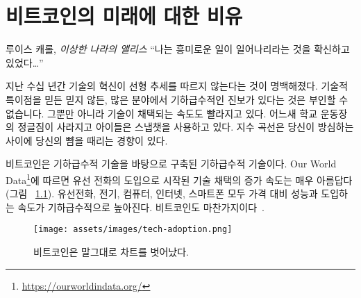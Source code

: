 \chapter{비트코인의 미래에 대한 비유}
\label{les:21}

\begin{chapquote}{루이스 캐롤, \textit{이상한 나라의 앨리스}}
\enquote{나는 흥미로운 일이 일어나리라는 것을 확신하고 있었다\ldots}
\end{chapquote}

\begin{comment}
In the last couple of decades, it became ap유hether you believe in the
technological singularity or not, it is undeniable that progress is
exponential in many fields. Not only that, but the rate at which
technologies are being adopted is accelerating, and before you know it
the bush in the local schoolyard is gone and your kids are using
Snapchat instead. Exponential curves have the tendency to slap you in
the face way before you see them coming.
\end{comment}
지난 수십 년간 기술의 혁신이 선형 추세를 따르지 않는다는 것이 명백해졌다.
기술적 특이점을 믿든 믿지 않든, 많은 분야에서 기하급수적인 진보가 있다는 것은 부인할 수 없습니다.
그뿐만 아니라 기술이 채택되는 속도도 빨라지고 있다. 
어느새 학교 운동장의 정글짐이 사라지고 아이들은 스냅챗을 사용하고 있다.
지수 곡선은 당신이 방심하는 사이에 당신의 뺨을 때리는 경향이 있다.

\begin{comment}
Bitcoin is an exponential technology built upon exponential technologies.
\textit{Our World in Data}\footnote{\url{https://ourworldindata.org/}}
beautifully shows the rising speed of technological adoption, starting in 1903
with the introduction of landlines (see Figure~\ref{fig:tech-adoption}).
Landlines, electricity, computers, the internet, smartphones; all follow
exponential trends in price-performance and adoption. Bitcoin does
too~\cite{tech-adoption}.
\end{comment}
비트코인은 기하급수적 기술을 바탕으로 구축된 기하급수적 기술이다.
Our World Data\footnote{\url{https://ourworldindata.org/}}에 따르면 유선 전화의 도입으로 시작된
기술 채택의 증가 속도는 매우 아름답다(그림 ~\ref{fig:tech-adoption}).
유선전화, 전기, 컴퓨터, 인터넷, 스마트폰 모두 가격 대비 성능과 도입하는 속도가 기하급수적으로 높아진다.
비트코인도 마찬가지이다~\cite{tech-adoption}.

\begin{figure}
  \texttt{[image: assets/images/tech-adoption.png]}
  \caption{비트코인은 말그대로 차트를 벗어났다.}
  \label{fig:tech-adoption}
\end{figure}

